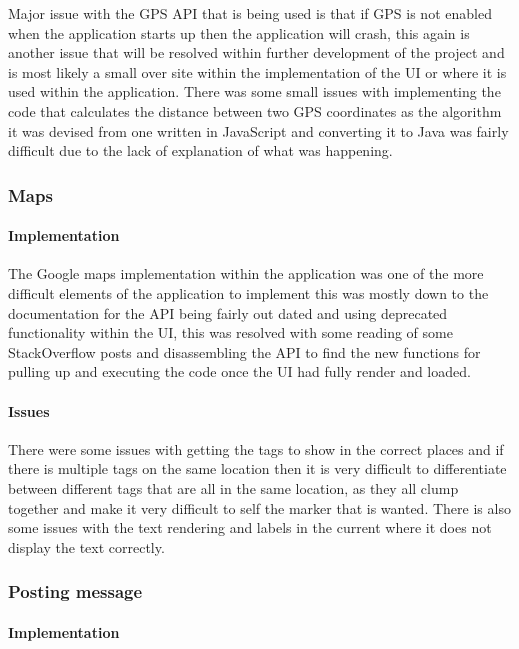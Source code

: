 Major issue with the GPS API that is being used is that if GPS is not enabled when the application starts up then the application will crash, this again is another issue that will be resolved within further development of the project and is most likely a small over site within the implementation of the UI or where it is used within the application. There was some small issues with implementing the code that calculates the distance between two GPS coordinates as the algorithm it was devised from one written in JavaScript and converting it to Java was fairly difficult due to the lack of explanation of what was happening.


\subsubsection*{Maps}

\paragraph*{Implementation}

The Google maps implementation within the application was one of the more difficult elements of the application to implement this was mostly down to the documentation for the API being fairly out dated and using deprecated functionality within the UI, this was resolved with some reading of some StackOverflow posts and disassembling the API to find the new functions for pulling up and executing the code once the UI had fully render and loaded. 

\paragraph*{Issues}

There were some issues with getting the tags to show in the correct places and if there is multiple tags on the same location then it is very difficult to differentiate between different tags that are all in the same location, as they all clump together and make it very difficult to self the marker that is wanted. There is also some issues with the text rendering and labels in the current where it does not display the text correctly.


\subsubsection*{Posting message}

\paragraph*{Implementation}

